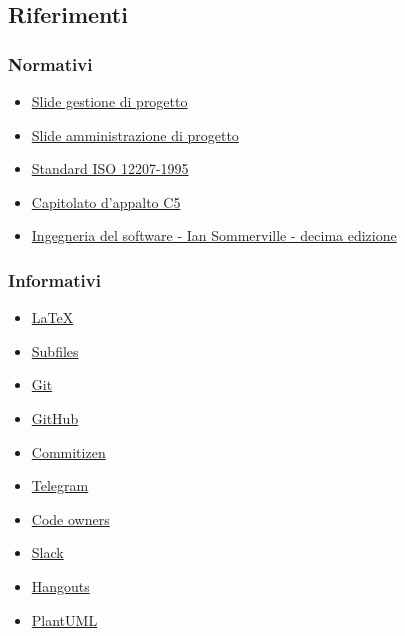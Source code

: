 \documentclass[../norme-di-progetto.tex]{subfiles}
\begin{document}
\subsection{Riferimenti}%
\label{sub:riferimenti}

\subsubsection{Normativi}%
\label{subs:riferimenti/normativi}

\begin{itemize}
  \item \href{https://www.math.unipd.it/~tullio/IS-1/2019/Dispense/L06.pdf}{Slide gestione di progetto}
  \item \href{https://www.math.unipd.it/~tullio/IS-1/2019/Dispense/FC01.pdf}{Slide amministrazione di progetto}
  \item \href{https://www.math.unipd.it/~tullio/IS-1/2009/Approfondimenti/ISO_12207-1995.pdf}{Standard ISO 12207-1995}
  \item \href{https://www.math.unipd.it/~tullio/IS-1/2019/Progetto/C5.pdf}{Capitolato d'appalto C5}
  \item \href{https://www.pearson.it/opera/pearson/0-6424-ingegneria_del_software}{Ingegneria del software - Ian Sommerville - decima edizione}
\end{itemize}

\subsubsection{Informativi}%
\label{subs:riferimenti/informativi}

\begin{itemize}
  \item \href{https://www.latex-project.org/help/documentation/}{\LaTeX}
  \item \href{https://www.overleaf.com/learn/latex/Multi-file_LaTeX_projects#The_subfiles_package}{Subfiles}
  \item \href{https://git-scm.com/}{Git}
  \item \href{https://github.com/}{GitHub}
  \item \href{https://commitizen.github.io/cz-cli/}{Commitizen}
  \item \href{https://desktop.telegram.org/}{Telegram}
  \item \href{https://help.github.com/en/github/creating-cloning-and-archiving-repositories/about-code-owners}{Code owners}
  \item \href{https://slack.com/intl/en-it/}{Slack}
  \item \href{https://hangouts.google.com}{Hangouts}
  \item \href{https://plantuml.com/}{PlantUML}
\end{itemize}
\end{document}

